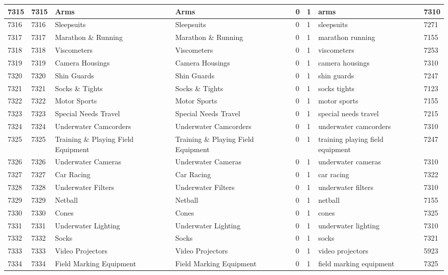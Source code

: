 \begin{longtable}{|l|l|l|l|l|l|l|l|}
7315 & 7315 & Arms & Arms & 0 & 1 & arms & 7310 \\ \hline 
7316 & 7316 & Sleepsuits & Sleepsuits & 0 & 1 & sleepsuits & 7271 \\ \hline 
7317 & 7317 & Marathon \& Running & Marathon \& Running & 0 & 1 & marathon running & 7155 \\ \hline 
7318 & 7318 & Viscometers & Viscometers & 0 & 1 & viscometers & 7253 \\ \hline 
7319 & 7319 & Camera Housings & Camera Housings & 0 & 1 & camera housings & 7310 \\ \hline 
7320 & 7320 & Shin Guards & Shin Guards & 0 & 1 & shin guards & 7247 \\ \hline 
7321 & 7321 & Socks \& Tights & Socks \& Tights & 0 & 1 & socks tights & 7123 \\ \hline 
7322 & 7322 & Motor Sports & Motor Sports & 0 & 1 & motor sports & 7155 \\ \hline 
7323 & 7323 & Special Needs Travel & Special Needs Travel & 0 & 1 & special needs travel & 7215 \\ \hline 
7324 & 7324 & Underwater Camcorders & Underwater Camcorders & 0 & 1 & underwater camcorders & 7310 \\ \hline 
7325 & 7325 & Training \& Playing Field Equipment & Training \& Playing Field Equipment & 0 & 1 & training playing field equipment & 7247 \\ \hline 
7326 & 7326 & Underwater Cameras & Underwater Cameras & 0 & 1 & underwater cameras & 7310 \\ \hline 
7327 & 7327 & Car Racing & Car Racing & 0 & 1 & car racing & 7322 \\ \hline 
7328 & 7328 & Underwater Filters & Underwater Filters & 0 & 1 & underwater filters & 7310 \\ \hline 
7329 & 7329 & Netball & Netball & 0 & 1 & netball & 7155 \\ \hline 
7330 & 7330 & Cones & Cones & 0 & 1 & cones & 7325 \\ \hline 
7331 & 7331 & Underwater Lighting & Underwater Lighting & 0 & 1 & underwater lighting & 7310 \\ \hline 
7332 & 7332 & Socks & Socks & 0 & 1 & socks & 7321 \\ \hline 
7333 & 7333 & Video Projectors & Video Projectors & 0 & 1 & video projectors & 5923 \\ \hline 
7334 & 7334 & Field Marking Equipment & Field Marking Equipment & 0 & 1 & field marking equipment & 7325 \\ \hline 

\end{longtable}
